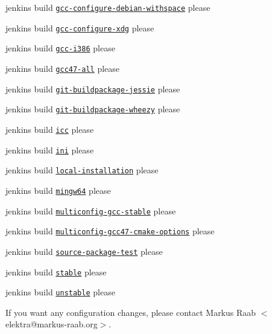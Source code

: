 \begin{DoxyItemize}
\item jenkins build \href{http://build.libelektra.org:8080/job/elektra-gcc-configure-debian-withspace/}{\tt gcc-\/configure-\/debian-\/withspace} please
\item jenkins build \href{http://build.libelektra.org:8080/job/elektra-gcc-configure-xdg/}{\tt gcc-\/configure-\/xdg} please
\item jenkins build \href{http://build.libelektra.org:8080/job/elektra-gcc-i386/}{\tt gcc-\/i386} please
\item jenkins build \href{http://build.libelektra.org:8080/job/elektra-gcc47-all/}{\tt gcc47-\/all} please
\item jenkins build \href{http://build.libelektra.org:8080/job/elektra-git-buildpackage-jessie/}{\tt git-\/buildpackage-\/jessie} please
\item jenkins build \href{http://build.libelektra.org:8080/job/elektra-git-buildpackage-wheezy/}{\tt git-\/buildpackage-\/wheezy} please
\item jenkins build \href{http://build.libelektra.org:8080/job/elektra-icc/}{\tt icc} please
\item jenkins build \href{http://build.libelektra.org:8080/job/elektra-ini-mergerequests/}{\tt ini} please
\item jenkins build \href{http://build.libelektra.org:8080/job/elektra-local-installation/}{\tt local-\/installation} please
\item jenkins build \href{http://build.libelektra.org:8080/job/elektra-gcc-configure-mingw-w64/}{\tt mingw64} please
\item jenkins build \href{http://build.libelektra.org:8080/job/elektra-multiconfig-gcc-stable/}{\tt multiconfig-\/gcc-\/stable} please
\item jenkins build \href{http://build.libelektra.org:8080/job/elektra-multiconfig-gcc47-cmake-options/}{\tt multiconfig-\/gcc47-\/cmake-\/options} please
\item jenkins build \href{http://build.libelektra.org:8080/job/elektra-source-package-test/}{\tt source-\/package-\/test} please
\item jenkins build \href{http://build.libelektra.org:8080/job/elektra-mergerequests-stable/}{\tt stable} please
\item jenkins build \href{http://build.libelektra.org:8080/job/elektra-mergerequests-unstable/}{\tt unstable} please
\end{DoxyItemize}

If you want any configuration changes, please contact {\ttfamily Markus Raab $<$elektra@markus-\/raab.\+org$>$}. 